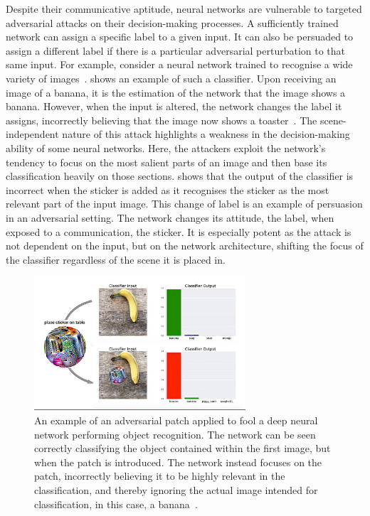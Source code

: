 Despite their communicative aptitude, neural networks are vulnerable to targeted adversarial attacks on their decision-making processes. A sufficiently trained network can assign a specific label to a given input. It can also be persuaded to assign a different label if there is a particular adversarial perturbation to that same input. For example, consider a neural network trained to recognise a wide variety of images~\cite{Krizhevsky2012ImageNetNetworks}.  shows an example of such a classifier. Upon receiving an image of a banana, it is the estimation of the network that the image shows a banana. However, when the input is altered, the network changes the label it assigns, incorrectly believing that the image now shows a toaster~\cite{Goodfellow2014ExplainingExamples, Brown2017AdversarialPatch}. The scene-independent nature of this attack highlights a weakness in the decision-making ability of some neural networks. Here, the attackers exploit the network's tendency to focus on the most salient parts of an image and then base its classification heavily on those sections.  shows that the output of the classifier is incorrect when the sticker is added as it recognises the sticker as the most relevant part of the input image. This change of label is an example of persuasion in an adversarial setting. The network changes its attitude, the label, when exposed to a communication, the sticker. It is especially potent as the attack is not dependent on the input, but on the network architecture, shifting the focus of the classifier regardless of the scene it is placed in. 



\begin{figure}[ht]
    \centering
    \includegraphics[trim={0, 7mm, 0, 0}, clip, width=0.7\textwidth]{Images/Misc/AdversarialPatches.png}
    \caption{An example of an adversarial patch applied to fool a deep neural network performing object recognition. The network can be seen correctly classifying the object contained within the first image, but when the patch is introduced. The network instead focuses on the patch, incorrectly believing it to be highly relevant in the classification, and thereby ignoring the actual image intended for classification, in this case, a banana~\cite{Brown2017AdversarialPatch}. }
    \label{fig:adversarial_patch}
\end{figure}


